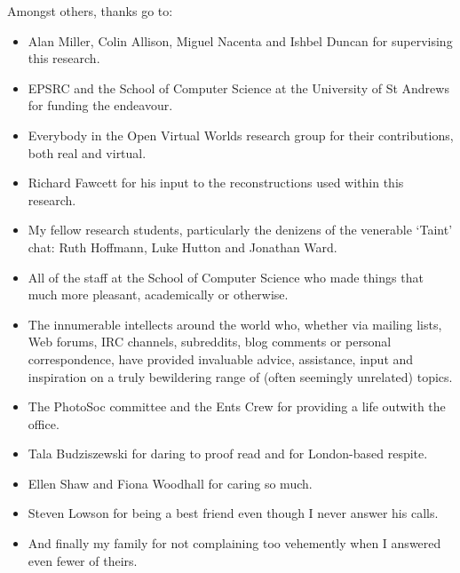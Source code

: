 Amongst others, thanks go to:

\begin{itemize}

	\item Alan Miller, Colin Allison, Miguel Nacenta and Ishbel Duncan for supervising this research.
	
	\item EPSRC and the School of Computer Science at the University of St Andrews for funding the endeavour.
	
	\item Everybody in the Open Virtual Worlds research group for their contributions, both real and virtual.
	
	\item Richard Fawcett for his input to the reconstructions used within this research.
	
	\item My fellow research students, particularly the denizens of the venerable `Taint' chat: Ruth Hoffmann, Luke Hutton and Jonathan Ward.
	
	\item All of the staff at the School of Computer Science who made things that much more pleasant, academically or otherwise.
	
	\item The innumerable intellects around the world who, whether via mailing lists, Web forums, IRC channels, subreddits, blog comments or personal correspondence, have provided invaluable advice, assistance, input and inspiration on a truly bewildering range of (often seemingly unrelated) topics.
	
	\item The PhotoSoc committee and the Ents Crew for providing a life outwith the office.
	
	\item Tala Budziszewski for daring to proof read and for London-based respite.
	
	\item Ellen Shaw and Fiona Woodhall for caring so much.
	
	\item Steven Lowson for being a best friend even though I never answer his calls.
	
	\item And finally my family for not complaining too vehemently when I answered even fewer of theirs.

\end{itemize}
